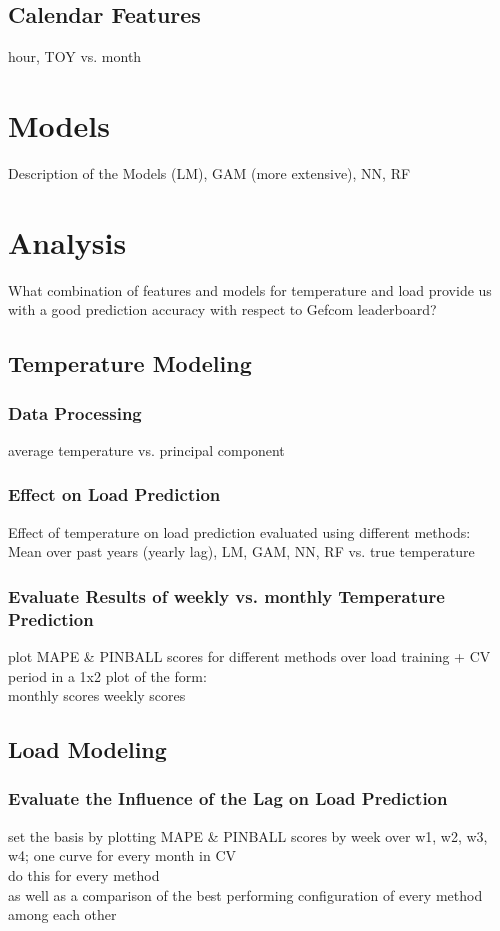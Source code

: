 \documentclass[conference]{IEEEtran}
\begin{document}
\subsection{Calendar Features}
hour, TOY vs. month
\cite{Fan2010}
\cite{Hyndman2010}

\section{Models}
Description of the Models (LM), GAM (more extensive), NN, RF

\section{Analysis}
What combination of features and models for temperature and load provide us with a good prediction accuracy with respect to Gefcom leaderboard?

\subsection{Temperature Modeling}
\subsubsection{Data Processing}
average temperature vs. principal component

\subsubsection{Effect on Load Prediction}
Effect of temperature on load prediction evaluated using different methods:\\
Mean over past years (yearly lag), LM, GAM, NN, RF vs. true temperature

\subsubsection{Evaluate Results of weekly vs. monthly Temperature Prediction}
plot MAPE \& PINBALL scores for different methods over load training + CV period in a 1x2 plot of the form:\\
monthly scores \quad weekly scores

\subsection{Load Modeling}

\subsubsection{Evaluate the Influence of the Lag on Load Prediction}
set the basis by plotting MAPE \& PINBALL scores by week over w1, w2, w3, w4; one curve for every month in CV\\
do this for every method\\
as well as a comparison of the best performing configuration of every method among each other\\
\end{document}
